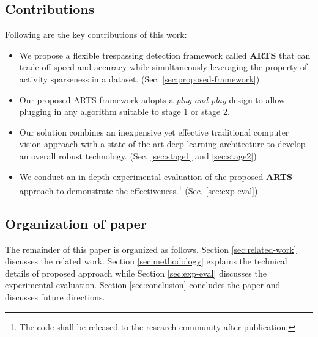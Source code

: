\subsection{Contributions}
Following are the key contributions of this work:
\begin{itemize}
\item We propose a flexible trespassing detection framework called \textbf{ARTS} that can trade-off speed and accuracy while simultaneously leveraging the property of activity sparseness in a dataset. (Sec. \ref{sec:proposed-framework})

\item Our proposed ARTS framework adopts a \textit{plug and play} design to allow plugging in any algorithm suitable to stage 1 or stage 2. 

\item Our solution combines an inexpensive yet effective traditional computer vision approach with a state-of-the-art deep learning architecture to develop an overall robust technology. (Sec. \ref{sec:stage1} and \ref{sec:stage2})

\item We conduct an in-depth experimental evaluation of the proposed \textbf{ARTS} approach to demonstrate the effectiveness.\footnote{The code shall be released to the research community after publication.} (Sec. \ref{sec:exp-eval})



\end{itemize}
\subsection{Organization of paper}
The remainder of this paper is organized as follows.  Section \ref{sec:related-work} discusses the related work. Section \ref{sec:methodology} explains the technical details of proposed approach while Section \ref{sec:exp-eval} discusses the experimental evaluation. Section \ref{sec:conclusion} concludes the paper and discusses future directions. 